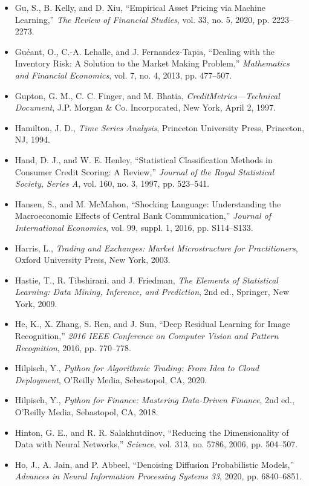 \documentclass{book}
\begin{document}
\begin{itemize}
    \item Gu, S., B. Kelly, and D. Xiu, ``Empirical Asset Pricing via Machine Learning,'' \emph{The Review of Financial Studies}, vol. 33, no. 5, 2020, pp. 2223--2273.
    \item Guéant, O., C.-A. Lehalle, and J. Fernandez-Tapia, ``Dealing with the Inventory Risk: A Solution to the Market Making Problem,'' \emph{Mathematics and Financial Economics}, vol. 7, no. 4, 2013, pp. 477--507.
    \item Gupton, G. M., C. C. Finger, and M. Bhatia, \emph{CreditMetrics---Technical Document}, J.P. Morgan \& Co. Incorporated, New York, April 2, 1997.
    \item Hamilton, J. D., \emph{Time Series Analysis}, Princeton University Press, Princeton, NJ, 1994.
    \item Hand, D. J., and W. E. Henley, ``Statistical Classification Methods in Consumer Credit Scoring: A Review,'' \emph{Journal of the Royal Statistical Society, Series A}, vol. 160, no. 3, 1997, pp. 523--541.
    \item Hansen, S., and M. McMahon, ``Shocking Language: Understanding the Macroeconomic Effects of Central Bank Communication,'' \emph{Journal of International Economics}, vol. 99, suppl. 1, 2016, pp. S114--S133.
    \item Harris, L., \emph{Trading and Exchanges: Market Microstructure for Practitioners}, Oxford University Press, New York, 2003.
    \item Hastie, T., R. Tibshirani, and J. Friedman, \emph{The Elements of Statistical Learning: Data Mining, Inference, and Prediction}, 2nd ed., Springer, New York, 2009.
    \item He, K., X. Zhang, S. Ren, and J. Sun, ``Deep Residual Learning for Image Recognition,'' \emph{2016 IEEE Conference on Computer Vision and Pattern Recognition}, 2016, pp. 770--778.
    \item Hilpisch, Y., \emph{Python for Algorithmic Trading: From Idea to Cloud Deployment}, O'Reilly Media, Sebastopol, CA, 2020.
    \item Hilpisch, Y., \emph{Python for Finance: Mastering Data-Driven Finance}, 2nd ed., O'Reilly Media, Sebastopol, CA, 2018.
    \item Hinton, G. E., and R. R. Salakhutdinov, ``Reducing the Dimensionality of Data with Neural Networks,'' \emph{Science}, vol. 313, no. 5786, 2006, pp. 504--507.
    \item Ho, J., A. Jain, and P. Abbeel, ``Denoising Diffusion Probabilistic Models,'' \emph{Advances in Neural Information Processing Systems 33}, 2020, pp. 6840--6851.

\end{itemize}
\end{document}
